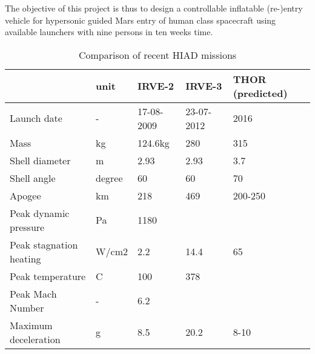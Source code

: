 The objective of this project is thus to design a controllable inflatable (re-)entry vehicle for hypersonic guided Mars entry of human class spacecraft using available launchers with nine persons in ten weeks time.

\begin{table}[ht!]
\vspace{-20mm}
	\caption{Comparison of recent HIAD missions}%
		\begin{tabular}{|p{}|p{}|p{}|p{}|p{}|} %
			\hline

           &       unit &     IRVE-2 \cite{irve2} &     IRVE-3 \citep{irve3,thor} & THOR (predicted) \citep{thor} \\
			\hline

Launch date &          - & 17-08-2009 & 23-07-2012 &       2016 \\
			\hline

      Mass &         kg &    124.6kg &        280 &        315 \\
			\hline

Shell diameter &          m &       2.93 &       2.93 &        3.7 \\
			\hline

Shell angle &     degree &         60 &         60 &         70 \\
			\hline

    Apogee &         km &        218 &        469 &    200-250 \\
			\hline

Peak dynamic pressure &         Pa &       1180 &            &            \\
			\hline

Peak stagnation heating &      W/cm2 &        2.2 &       14.4 &         65 \\
			\hline

Peak temperature &          C &        100 &        378 &            \\
			\hline

Peak Mach Number &          - &        6.2 &            &            \\
			\hline

Maximum deceleration &          g &        8.5 &       20.2 &       8-10 \\
			\hline

		\end{tabular}
    \label{tab:hiadcomparison}%
\end{table}


